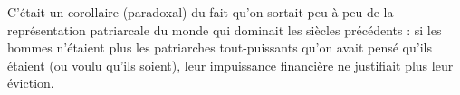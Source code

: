 C'était un corollaire (paradoxal) du fait qu'on sortait peu à peu de la représentation patriarcale du monde qui dominait les siècles précédents : si les hommes n'étaient plus les patriarches tout-puissants qu'on avait pensé qu'ils étaient (ou voulu qu'ils soient), leur impuissance financière ne justifiait plus leur éviction.
 
 
